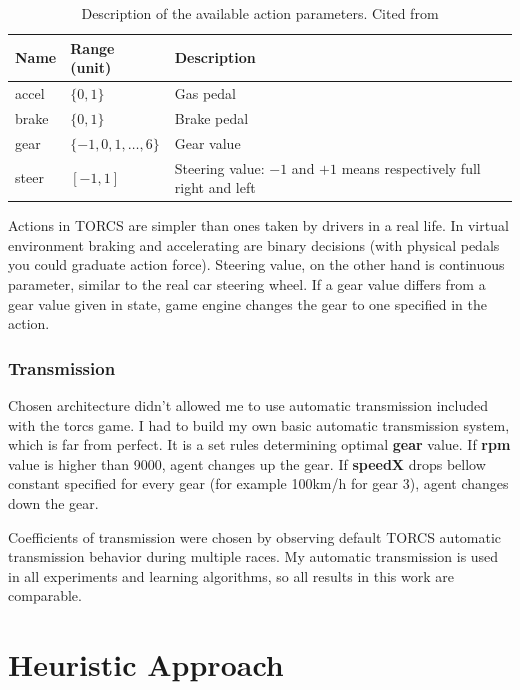 \documentclass[declaration,shortabstract,english,inz]{iithesis}
\begin{document}
\begin{table}[h]
    \centering
    \begin{tabular}{|p{1.2cm}|p{2.8cm}|p{8.5cm}|}
        \hline
        \textbf{Name} & \textbf{Range (unit)} & \textbf{Description} \\ 
        \hline
        accel & $\{0,1\}$ & Gas pedal \\ 
     \hline
     brake &  $\{0,1\}$ & Brake pedal \\ 
     \hline
     gear & $\{-1,0,1,\dots ,6\}$ & Gear value \\ 
     \hline
     steer &  $[-1,1]$ & Steering value: $-1$ and $+1$ means respectively full right and
     left \\ 
     \hline
    \end{tabular}
    
    \caption{\label{tab:torcs_actions}Description of the available  action parameters. Cited from \cite{scrc_manual}}
\end{table}

Actions in TORCS are simpler than ones taken by drivers in a real life.
In virtual environment braking and accelerating are binary decisions (with physical pedals you could graduate action force).
Steering value, on the other hand is continuous parameter, similar to the real car steering wheel.
If a gear value differs from a gear value given in state, game engine changes the gear to one specified in the action.

\subsection{Transmission}


Chosen architecture didn’t allowed me to use automatic transmission included with the torcs game.
I had to build my own basic automatic transmission system, which is far from perfect.
It is a set rules determining optimal \textbf{gear} value.
If \textbf{rpm} value is higher than 9000, agent changes up the gear. If \textbf{speedX} drops bellow constant specified for every gear (for example 100km/h for gear 3), agent changes down the gear.

Coefficients of transmission were chosen by observing default TORCS automatic transmission behavior during multiple races.
My automatic transmission is used in all experiments and learning algorithms, so all results in this work are comparable.


\chapter{Heuristic Approach}
\end{document}
